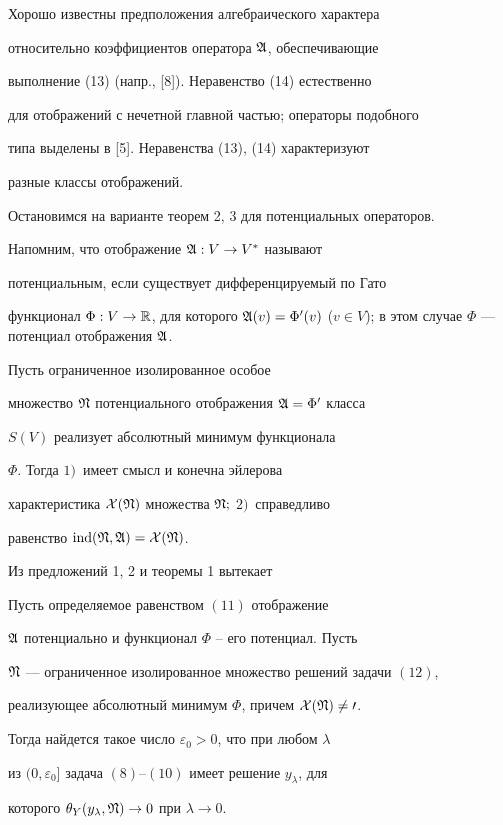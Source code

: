  


Хорошо известны предположения алгебраического характера 


относительно коэффициентов оператора $\frak A$, обеспечивающие 


выполнение (13) (напр., [8]). Неравенство (14) естественно 


для отображений с нечетной главной частью; операторы подобного 


типа выделены в [5]. Неравенства (13), (14) характеризуют 


разные классы отображений. 


 


Остановимся на варианте теорем 2, 3 для потенциальных операторов. 


Напомним, что отображение $\frak A:V\to V^*$ называют 


потенциальным, если существует дифференцируемый по Гато 


функционал $\Phi:V\to\Bbb R$, для которого $\frak A(v)=\Phi'(v)$ ($v\in 


V$); в этом случае $\Phi$ --- потенциал отображения $\frak A$. 


 


\begin{prop} 


Пусть ограниченное изолированное особое 


множество $\frak N$ потенциального отображения $\frak A=\Phi'$ класса 


$S(V)$ реализует абсолютный минимум функционала 


$\Phi$. Тогда $1)$~имеет смысл и конечна эйлерова 


характеристика $\cal X(\frak N)$ множества $\frak N;$ $2)$~справедливо 


равенство $\operatorname{ind}(\frak N,\frak A)=\cal X(\frak N)$. 


\end{prop} 


 


Из предложений 1, 2 и теоремы 1 вытекает 


 


\begin{thm} 


Пусть определяемое равенством $(11)$ отображение 


$\frak A$ потенциально и функционал $\Phi$ -- его потенциал. Пусть 


$\frak N$ --- ограниченное изолированное множество решений задачи $(12)$, 


реализующее абсолютный минимум $\Phi$, причем $\cal X(\frak N)\ne0$. 


Тогда найдется такое число $\varepsilon_0>0$, что при любом $\lambda$ 


из $(0,\varepsilon_0]$ задача $(8)$--$(10)$ имеет решение $y_\lambda$, для 


которого $\theta_Y(y_\lambda,\frak N)\to0$ при $\lambda\to0$. 


\end{thm} 



